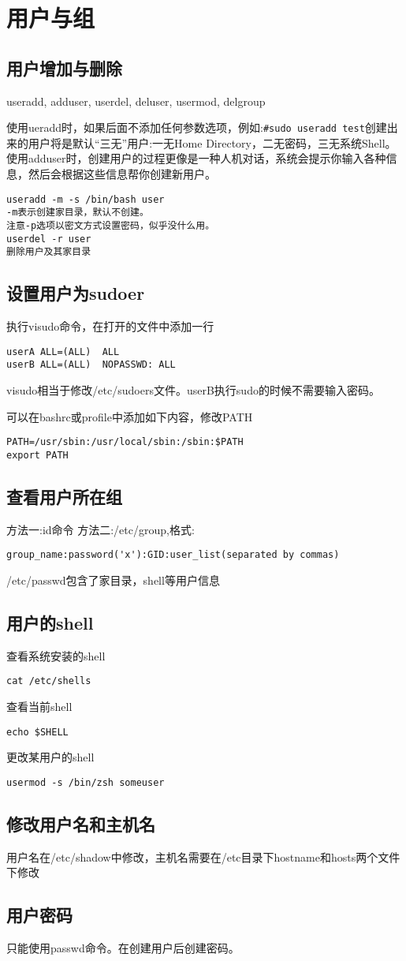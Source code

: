 \section{用户与组}

\subsection{用户增加与删除}
useradd, adduser, userdel, deluser, usermod, delgroup

使用ueradd时，如果后面不添加任何参数选项，例如:\verb+#sudo useradd test+创建出来的用户将是默认“三无”用户:一无Home Directory，二无密码，三无系统Shell。
使用adduser时，创建用户的过程更像是一种人机对话，系统会提示你输入各种信息，然后会根据这些信息帮你创建新用户。
\begin{verbatim}
useradd -m -s /bin/bash user 
-m表示创建家目录，默认不创建。
注意-p选项以密文方式设置密码，似乎没什么用。
userdel -r user
删除用户及其家目录
\end{verbatim}

\subsection{设置用户为sudoer}
执行visudo命令，在打开的文件中添加一行
\begin{verbatim}
userA ALL=(ALL)  ALL
userB ALL=(ALL)  NOPASSWD: ALL
\end{verbatim}
visudo相当于修改/etc/sudoers文件。userB执行sudo的时候不需要输入密码。

可以在bashrc或profile中添加如下内容，修改PATH
\begin{verbatim}
PATH=/usr/sbin:/usr/local/sbin:/sbin:$PATH
export PATH
\end{verbatim}

\subsection{查看用户所在组}
方法一:id命令
方法二:/etc/group,格式:
\begin{verbatim}
group_name:password('x'):GID:user_list(separated by commas)
\end{verbatim}

/etc/passwd包含了家目录，shell等用户信息

\subsection{用户的shell}
查看系统安装的shell
\begin{verbatim}
cat /etc/shells
\end{verbatim}

查看当前shell
\begin{verbatim}
echo $SHELL
\end{verbatim}

更改某用户的shell
\begin{verbatim}
usermod -s /bin/zsh someuser
\end{verbatim}


\subsection{修改用户名和主机名}
用户名在/etc/shadow中修改，主机名需要在/etc目录下hostname和hosts两个文件下修改

\subsection{用户密码}
只能使用passwd命令。在创建用户后创建密码。
